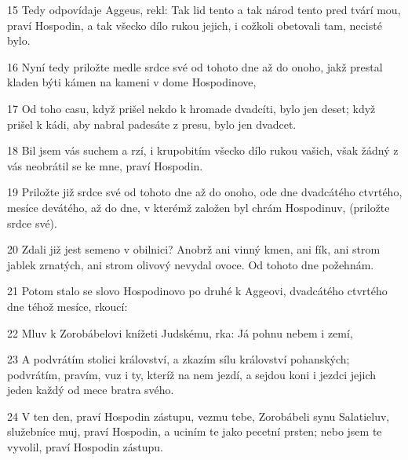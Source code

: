 \par 15 Tedy odpovídaje Aggeus, rekl: Tak lid tento a tak národ tento pred tvárí mou, praví Hospodin, a tak všecko dílo rukou jejich, i cožkoli obetovali tam, necisté bylo.
\par 16 Nyní tedy priložte medle srdce své od tohoto dne až do onoho, jakž prestal kladen býti kámen na kameni v dome Hospodinove,
\par 17 Od toho casu, když prišel nekdo k hromade dvadcíti, bylo jen deset; když prišel k kádi, aby nabral padesáte z presu, bylo jen dvadcet.
\par 18 Bil jsem vás suchem a rzí, i krupobitím všecko dílo rukou vašich, však žádný z vás neobrátil se ke mne, praví Hospodin.
\par 19 Priložte již srdce své od tohoto dne až do onoho, ode dne dvadcátého ctvrtého, mesíce devátého, až do dne, v kterémž založen byl chrám Hospodinuv, (priložte srdce své).
\par 20 Zdali již jest semeno v obilnici? Anobrž ani vinný kmen, ani fík, ani strom jablek zrnatých, ani strom olivový nevydal ovoce. Od tohoto dne požehnám.
\par 21 Potom stalo se slovo Hospodinovo po druhé k Aggeovi, dvadcátého ctvrtého dne téhož mesíce, rkoucí:
\par 22 Mluv k Zorobábelovi knížeti Judskému, rka: Já pohnu nebem i zemí,
\par 23 A podvrátím stolici království, a zkazím sílu království pohanských; podvrátím, pravím, vuz i ty, kteríž na nem jezdí, a sejdou koni i jezdci jejich jeden každý od mece bratra svého.
\par 24 V ten den, praví Hospodin zástupu, vezmu tebe, Zorobábeli synu Salatieluv, služebníce muj, praví Hospodin, a uciním te jako pecetní prsten; nebo jsem te vyvolil, praví Hospodin zástupu.

